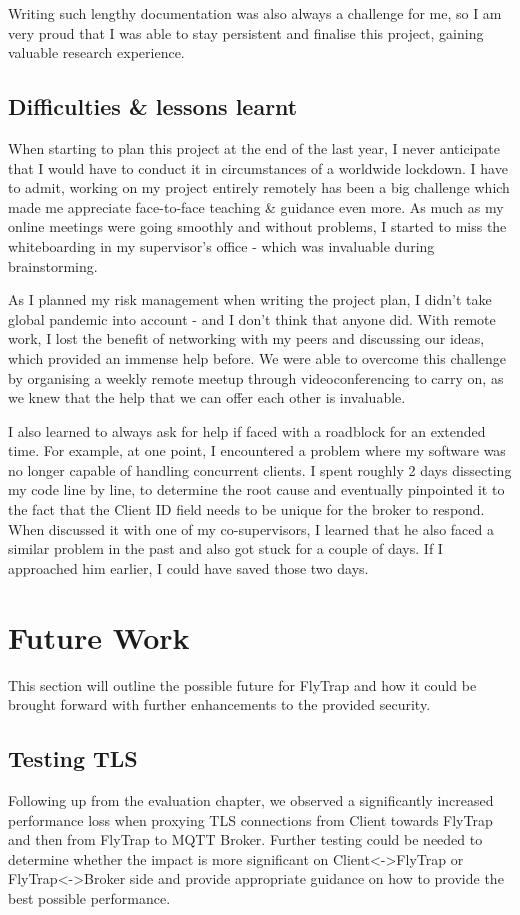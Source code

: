 Writing such lengthy documentation was also always a challenge for me, so I am very proud that I was able to stay persistent and finalise this project, gaining valuable research experience.

\subsection{Difficulties \& lessons learnt}
When starting to plan this project at the end of the last year, I never anticipate that I would have to conduct it in circumstances of a worldwide lockdown. I have to admit, working on my project entirely remotely has been a big challenge which made me appreciate face-to-face teaching \& guidance even more. As much as my online meetings were going smoothly and without problems, I started to miss the whiteboarding in my supervisor's office - which was invaluable during brainstorming.

As I planned my risk management when writing the project plan, I didn't take global pandemic into account - and I don't think that anyone did. With remote work, I lost the benefit of networking with my peers and discussing our ideas, which provided an immense help before. We were able to overcome this challenge by organising a weekly remote meetup through videoconferencing to carry on, as we knew that the help that we can offer each other is invaluable.

I also learned to always ask for help if faced with a roadblock for an extended time. For example, at one point, I encountered a problem where my software was no longer capable of handling concurrent clients. I spent roughly 2 days dissecting my code line by line, to determine the root cause and eventually pinpointed it to the fact that the Client ID field needs to be unique for the broker to respond. When discussed it with one of my co-supervisors, I learned that he also faced a similar problem in the past and also got stuck for a couple of days. If I approached him earlier, I could have saved those two days.

\section{Future Work}
This section will outline the possible future for FlyTrap and how it could be brought forward with further enhancements to the provided security.
\subsection{Testing TLS}
Following up from the evaluation chapter, we observed a significantly increased performance loss when proxying TLS connections from Client towards FlyTrap and then from FlyTrap to MQTT Broker. Further testing could be needed to determine whether the impact is more significant on \mbox{Client<->FlyTrap} or FlyTrap<->Broker side and provide appropriate guidance on how to provide the best possible performance.

